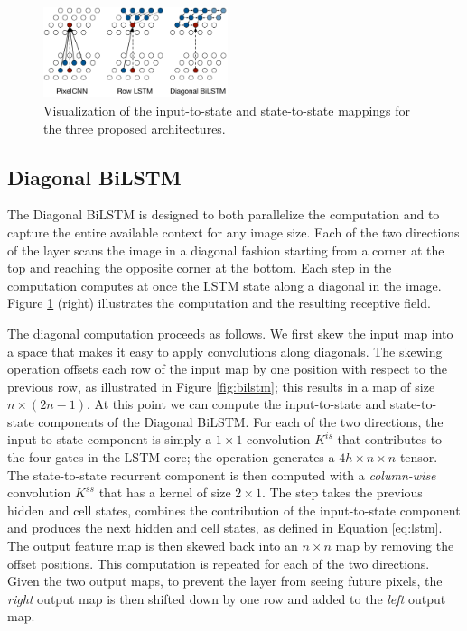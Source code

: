 \begin{figure}[ht]
\includegraphics[width=0.48\textwidth]{graphs3.pdf}
\vspace{-0.7cm}
\caption{Visualization of the input-to-state and state-to-state mappings for the three proposed architectures.}
\label{mappings}
\vspace{-0.2cm}
\end{figure}

\subsection{Diagonal BiLSTM}
\label{sect:diag_lstm}

The Diagonal BiLSTM is designed to both parallelize the computation and to capture the entire available context for any image size. Each of the two directions of the layer scans the image in a diagonal fashion starting from a corner at the top and reaching the opposite corner at the bottom. Each step in the computation computes at once the LSTM state along a diagonal in the image. Figure \ref{mappings} (right) illustrates the computation and the resulting receptive field.

The diagonal computation proceeds as follows. We first skew the input map into a space that makes it easy to apply convolutions along diagonals. The {skewing} operation offsets each row of the input map by one position with respect to the previous row, as illustrated in Figure \ref{fig:bilstm}; this results in a map of size $n \times (2n-1)$. At this point we can compute the input-to-state and state-to-state components of the Diagonal BiLSTM. For each of the two directions, the input-to-state component is simply a $1 \times 1$ convolution $K^{is}$ that contributes to the four gates in the LSTM core; the operation generates a $4 h \times n \times n$ tensor. The state-to-state recurrent component is then computed with a \emph{column-wise} convolution $K^{ss}$ that has a kernel of size $2 \times 1$. The step takes the previous hidden and cell states, combines the contribution of the input-to-state component and produces the next hidden and cell states, as defined in Equation \ref{eq:lstm}. The output feature map is then skewed back into an $n \times n$ map by removing the offset positions. This computation is repeated for each of the two directions. Given the two output maps, to prevent the layer from seeing future pixels, the \emph{right} output map is then shifted down by one row and added to the \emph{left} output map.
 
